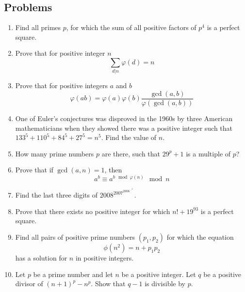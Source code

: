 \documentclass{article}
\begin{document}
\subsection{Problems}
\begin{enumerate}

\item 
Find all primes $p$, for which the sum of all positive factors of $p^4$ is a perfect square.

\item 
Prove that for positive integer $n$ 
$$\sum_{d|n} \varphi (d) =n $$

\item 
Prove that for positive integers $a$ and $b$ 
$$ \varphi(ab) = \varphi (a)\varphi(b)\frac{\gcd(a,b)}{\varphi(\gcd(a,b))} $$

\item %
One of Euler's conjectures was disproved in the 1960s by three American mathematicians when they showed there was a positive integer such that $133^5+110^5+84^5+27^5=n^5$. Find the value of ${n}$. 

\item  %
How many prime numbers $p$ are there, such that $29^p+1$ is a multiple of $p$?

\item 
Prove that if $\gcd(a,n)=1$, then
$$a^b \equiv a^{b \mod \varphi(n)}  \mod n$$

\item %
Find the last three digits of $2008^{2007^{2006^{\dots^{^{}2^{1}}}}}$.

\item 
Prove that there exists no positive integer for which $n! + 19^{93}$ is a perfect square.

\item 
Find all pairs of positive prime numbers $(p_1,p_2)$ for which the equation $$\phi(n^2) = n + p_1p_2$$
has a solution for $n$ in positive integers. 

\item %

Let $p$ be a prime number and let $n$ be a positive integer. Let $q$ be a positive divisor of $(n+1)^p-n^p$. Show that $q-1$ is divisible by $p$.

\end{enumerate}
\end{document}
